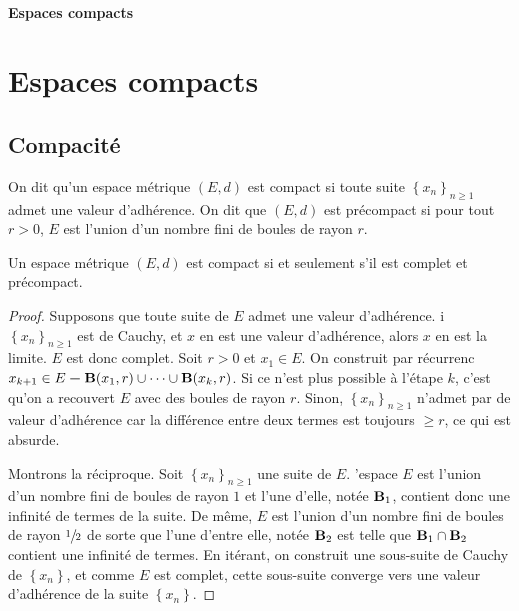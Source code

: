 \ifsolo
    ~

    \vspace{1cm}

    \begin{center}
        \textbf{\LARGE Espaces compacts} \\[1em]
    \end{center}
    \tableofcontents
\else
    \chapter{Espaces compacts}

    \minitoc
\fi
\thispagestyle{empty}

\section{Compacité}

\begin{dfn}
    On dit qu'un espace métrique $(E, d)$ est compact si toute suite  $\left\{ x_n \right\} _{n\geq 1}$ admet une valeur d'adhérence. On dit que $(E, d)$ est précompact si pour tout  $r>0$,  $E$ est l'union d'un nombre fini de boules de rayon  $r$.
\end{dfn}

\begin{thm}
    Un espace métrique $(E, d)$ est compact  si et seulement s'il est complet et précompact.
\end{thm}

\begin{proof}
    Supposons que toute suite de $E$ admet une valeur d'adhérence.  i $ \left\{ x_n \right\}_{n\geq 1} $ est de Cauchy, et $x$ en est une valeur d'adhérence, alors $x$ en est la limite. $E$ est donc complet. Soit $r>0$ et $x_1 \in  E$. On construit par récurrenc $x _{k+1} \in  E \bm- \mathbf B(x_1,r)\cup \cdots \cup \mathbf B(x_k, r)$. Si ce n'est plus possible à l'étape $k$, c'est qu'on a recouvert $E$ avec des boules de rayon $r$. Sinon, $ \left\{ x_n \right\}_{n\geq 1} $ n'admet par de valeur d'adhérence car la différence entre deux termes est toujours $ \geq r$, ce qui est absurde.

    Montrons la réciproque. Soit $ \left\{ x_n \right\}_{n\geq 1} $ une suite de $E$.  'espace $E$ est l'union d'un nombre fini de boules de rayon $1$ et l'une d'elle, notée $ \mathbf B_1$, contient donc une infinité de termes de la suite. De même, $E$ est l'union d'un nombre fini de boules de rayon $\sfrac12$ de sorte que l'une d'entre elle, notée  $\mathbf B_2$ est telle que  $\mathbf B_1\cap \mathbf B_2$ contient une infinité de termes. En itérant, on construit une sous-suite de Cauchy de $\left\{ x_n \right\} $, et comme $E$ est complet, cette sous-suite converge vers une valeur d'adhérence de la suite  $\left\{ x_n \right\} $.
\end{proof}

